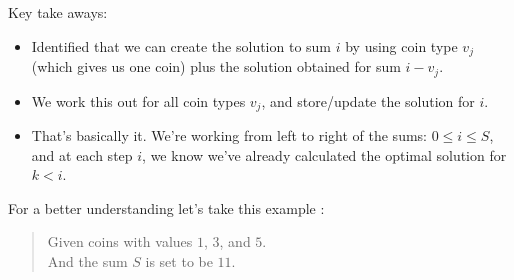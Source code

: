 Key take aways:
\begin{itemize}%
\item Identified that we can create the solution to sum $i$ by using coin
  type $v_j$ (which gives us one coin) plus the solution obtained for sum
  $i-v_j$.
\item We work this out for all coin types $v_j$, and store/update the
  solution for $i$.
\item That's basically it. We're working from left to right of the sums:
  $0\leq i\leq S$, and at each step $i$, we know we've already calculated
  the optimal solution for $k<i$.
\end{itemize}

\RayNotesEnd

For a better understanding let's take this example :
\begin{quotation}
Given coins with values $1$, $3$, and $5$.\\
And the sum $S$ is set to be $11$.
\end{quotation}

